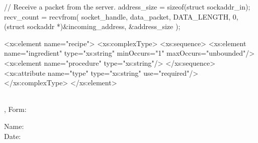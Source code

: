\documentclass[12pt]{examdesign}
\begin{document}
\begin{lrbox}{\udpQuestion}%
\begin{minipage}{0.9\textwidth}
\begin{codelisting}
// Receive a packet from the server.
address_size = sizeof(struct sockaddr_in);
recv_count = recvfrom(
  socket_handle,
  data_packet,
  DATA_LENGTH,
  0,
  (struct sockaddr *)&incoming_address,
  &address_size
);
\end{codelisting}%
\end{minipage}%
\end{lrbox}

\begin{lrbox}{\xmlQuestion}%
\begin{minipage}{0.9\textwidth}
\begin{codelisting}
<xs:element name="recipe">
  <xs:complexType>
    <xs:sequence>
      <xs:element name="ingredient" type="xs:string"
                  minOccurs="1" maxOccurs="unbounded"/>
      <xs:element name="procedure" type="xs:string"/>
    </xs:sequence>
    <xs:attribute name="type" type="xs:string" use="required"/>
  </xs:complexType>
</xs:element>
\end{codelisting}%
\end{minipage}%
\end{lrbox}

\begin{examtop}
  \parbox{3in}{\classdata \\
               \examtype, Form: }
  \hfill
  \parbox{3in}{\normalsize Name: \hrulefill \\[2.0ex]
                           Date: \hrulefill }
  \bigskip

\end{examtop}
\end{document}
